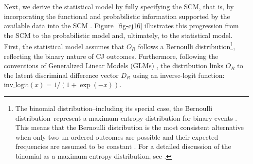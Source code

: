 \documentclass[
  authoryear,
  review,
  1p]{elsarticle}
\begin{document}
Next, we derive the statistical model by fully specifying the SCM, that
is, by incorporating the functional and probabilistic information
supported by the available data into the SCM \citep{Pearl_et_al_2016}.
Figure~\ref{fig-cj16} illustrates this progression from the SCM to the
probabilistic model and, ultimately, to the statistical model. First,
the statistical model assumes that \(O_{R}\) follows a Bernoulli
distribution\footnote{The binomial distribution--including its special
  case, the Bernoulli distribution--represent a maximum entropy
  distribution for binary events \citep[p.~34]{McElreath_2020}. This
  means that the Bernoulli distribution is the most consistent
  alternative when only two un-ordered outcomes are possible and their
  expected frequencies are assumed to be constant
  \citep[p.~310]{McElreath_2020}. For a detailed discussion of the
  binomial as a maximum entropy distribution, see
  \citet[sec.~10.1.2]{McElreath_2020}.}, reflecting the binary nature of
CJ outcomes. Furthermore, following the conventions of Generalized
Linear Models (GLMs)
\citep{Nelder_et_al_1983, Nelder_et_al_1996, Agresti_2015}, the
distribution links \(O_{R}\) to the latent discriminal difference vector
\(D_{R}\) using an inverse-logit function:
\(\text{inv\_logit}(x) = 1/(1 + \exp(-x))\).
\end{document}
